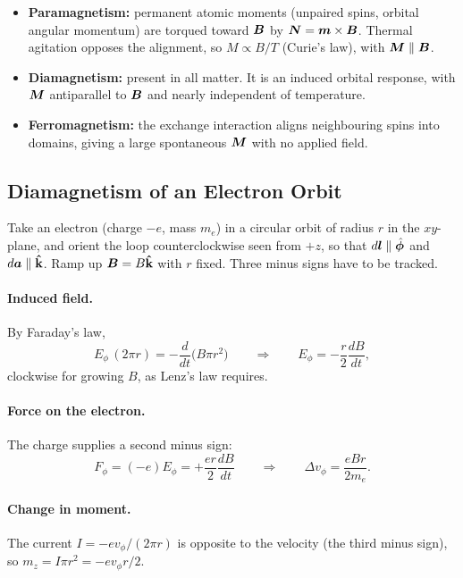 \begin{fact}
\leavevmode
\begin{itemize}
    \item \textbf{Paramagnetism:} permanent atomic moments (unpaired spins, orbital angular momentum) are torqued toward $\vect{B}$ by $\vect{N} = \lvect{m}\times\vect{B}$. Thermal agitation opposes the alignment, so $M\propto B/T$ (Curie's law), with $\vect{M}\parallel\vect{B}$.
    \item \textbf{Diamagnetism:} present in all matter. It is an induced orbital response, with $\vect{M}$ antiparallel to $\vect{B}$ and nearly independent of temperature.
    \item \textbf{Ferromagnetism:} the exchange interaction aligns neighbouring spins into domains, giving a large spontaneous $\vect{M}$ with no applied field.
\end{itemize}
\end{fact}

\subsection{Diamagnetism of an Electron Orbit}

Take an electron (charge $-e$, mass $m_e$) in a circular orbit of radius $r$ in the $xy$-plane, and orient the loop counterclockwise seen from $+z$, so that $d\bm{l}\parallel\hat{\boldsymbol{\phi}}$ and $d\bm{a}\parallel\boldsymbol{\hat{\textbf{k}}}$. Ramp up $\vect{B} = B\khat$ with $r$ fixed. Three minus signs have to be tracked.

\paragraph{Induced field.} By Faraday's law,
\[
    E_\phi\,(2\pi r) = -\frac{d}{dt}\bigl(B\pi r^2\bigr)
    \qquad\Longrightarrow\qquad
    E_\phi = -\frac r2\frac{dB}{dt},
\]
clockwise for growing $B$, as Lenz's law requires.

\paragraph{Force on the electron.} The charge supplies a second minus sign:
\[
    F_\phi = (-e)E_\phi = +\frac{er}{2}\frac{dB}{dt}
    \qquad\Longrightarrow\qquad
    \Delta v_\phi = \frac{eBr}{2m_e}.
\]

\paragraph{Change in moment.} The current $I = -ev_\phi/(2\pi r)$ is opposite to the velocity (the third minus sign), so $m_z = I\pi r^2 = -ev_\phi r/2$.


